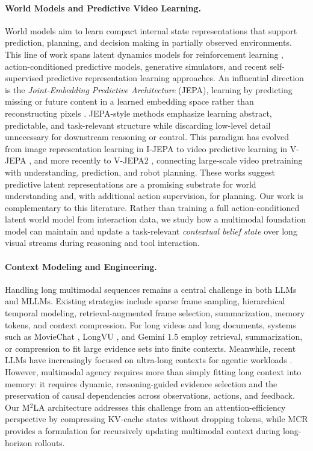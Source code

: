 \documentclass[11pt, letterpaper]{template}
\theoremstyle{plain}
\theoremstyle{definition}
\theoremstyle{remark}
\begin{document}
\paragraph{World Models and Predictive Video Learning.}
World models aim to learn compact internal state representations that support prediction, planning, and decision making in partially observed environments. This line of work spans latent dynamics models for reinforcement learning \citep{ha2018world,hafner2019dream,vjepa2}, action-conditioned predictive models, generative simulators, and recent self-supervised predictive representation learning approaches. An influential direction is the \emph{Joint-Embedding Predictive Architecture} (JEPA), learning by predicting missing or future content in a learned embedding space rather than reconstructing pixels \citep{ijepa,vjepa,vjepa2,vjepa21}. JEPA-style methods emphasize learning abstract, predictable, and task-relevant structure while discarding low-level detail unnecessary for downstream reasoning or control. This paradigm has evolved from image representation learning in I-JEPA \citep{ijepa} to video predictive learning in V-JEPA \citep{vjepa}, and more recently to V-JEPA2 \citep{vjepa2}, connecting large-scale video pretraining with understanding, prediction, and robot planning. These works suggest predictive latent representations are a promising substrate for world understanding and, with additional action supervision, for planning. Our work is complementary to this literature. Rather than training a full action-conditioned latent world model from interaction data, we study how a multimodal foundation model can maintain and update a task-relevant \emph{contextual belief state} over long visual streams during reasoning and tool interaction.

\paragraph{Context Modeling and Engineering.}
Handling long multimodal sequences remains a central challenge in both LLMs and MLLMs. Existing strategies include sparse frame sampling, hierarchical temporal modeling, retrieval-augmented frame selection, summarization, memory tokens, and context compression. For long videos and long documents, systems such as MovieChat \citep{moviechat}, LongVU \citep{longvu}, and Gemini 1.5 \citep{gemini} employ retrieval, summarization, or compression to fit large evidence sets into finite contexts. Meanwhile, recent LLMs have increasingly focused on ultra-long contexts for agentic workloads \citep{deepseekai2026deepseekv4}. However, multimodal agency requires more than simply fitting long context into memory: it requires dynamic, reasoning-guided evidence selection and the preservation of causal dependencies across observations, actions, and feedback. Our M$^2$LA architecture addresses this challenge from an attention-efficiency perspective by compressing KV-cache states without dropping tokens, while MCR provides a formulation for recursively updating multimodal context during long-horizon rollouts.
\end{document}
